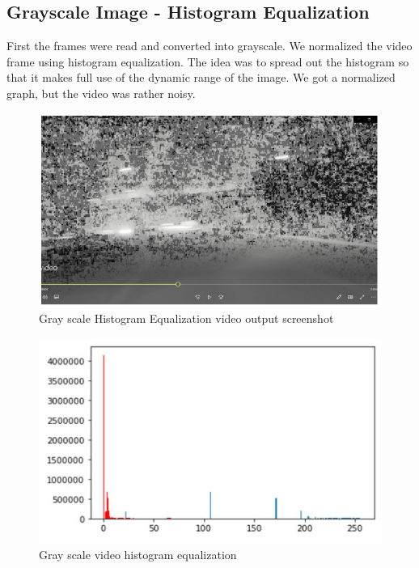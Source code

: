 \documentclass[12pt]{report}
\begin{document}
{\subsection*{Grayscale Image - Histogram Equalization} 

First the frames were read and converted into grayscale.  We normalized the video frame using histogram equalization. The idea was to spread out the histogram so that it makes full use of the dynamic range of the image. We got a normalized graph, but the video was rather noisy. \newline
\begin{figure}[h!]
    \centering
    \includegraphics[scale=0.4]{Capture3.JPG}
    \caption{Gray scale Histogram Equalization video output screenshot}
    \label{fig:my_label2}
\end{figure}
\begin{figure}[h!]
    \centering
    \includegraphics[scale=0.4]{Capture4.JPG}
    \caption{Gray scale video histogram equalization}
    \label{fig:my_label2}
\end{figure}


}
\end{document}
